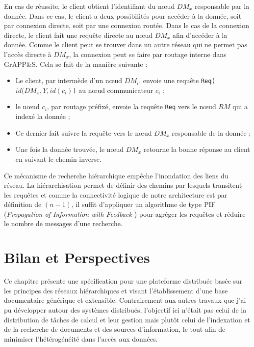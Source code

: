 En cas de réussite, le client obtient l'identifiant du n{\oe}ud $DM_x$ responsable par la donnée. Dans ce cas, le client a deux possibilités pour accéder à la donnée, soit par connexion directe, soit par une connexion routée. Dans le cas de la connexion directe, le client fait une requête directe au n{\oe}ud $DM_x$ afin d'accéder à la  donnée. Comme le client peut se trouver dans un autre réseau qui ne permet pas l'accès directe à $DM_x$, la connexion peut se faire par routage interne dans GrAPP\&S. Cela se fait de la manière suivante :
\begin{itemize}
	\item Le client, par intermède d'un n{\oe}ud $DM_i$, envoie une requête \texttt{Req($id(DM_x, Y, id(c_i)$)} au n{\oe}ud communicateur $c_i$ ;
	\item  le n{\oe}ud $c_i$, par routage préfixé, envoie la requête \texttt{Req} vers le n{\oe}ud $RM$ qui a indexé la donnée ;
	\item  Ce dernier fait suivre la requête vers le n{\oe}ud $DM_x$ responsable de la donnée ;
	\item Une fois la donnée trouvée, le n{\oe}ud $DM_x$ retourne la bonne réponse au client en suivant le chemin inverse.
\end{itemize}   

Ce mécanisme de recherche hiérarchique empêche l'inondation des liens du réseau. La hiérarchisation permet de définir des chemins par lesquels transitent les requêtes et comme la connectivité logique de notre architecture est par définition de $(n-1)$, il suffit d'appliquer un algorithme de type PIF (\textit{Propagation of Information with Feedback} \cite{Seg83}) pour agréger les requêtes et réduire le nombre de messages d'une recherche.  


\section{Bilan et Perspectives}

Ce chapitre présente une spécification pour une plateforme distribuée basée sur les principes des réseaux hiérarchiques et visant l'établissement d'une base documentaire générique et extensible. Contrairement aux autres travaux que j'ai pu développer autour des systèmes distribués, l'objectif ici n'était pas celui de la distribution de tâches de calcul et leur gestion mais plutôt celui de l'indexation et de la recherche de documents et des sources d'information, le tout afin de minimiser l'hétérogénéité dans l'accès aux données. 

